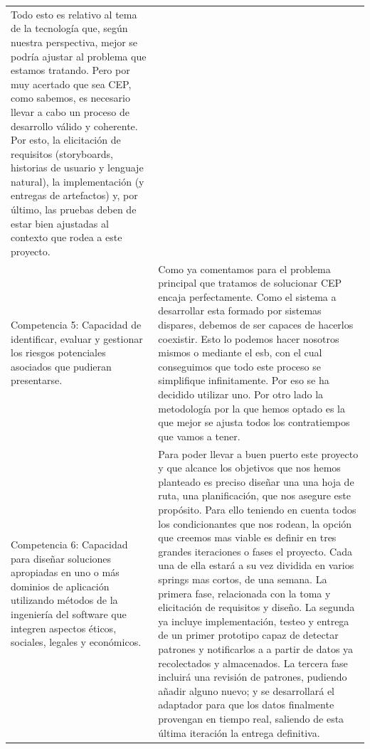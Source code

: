 \documentclass[a4paper]{article}
\begin{document}
\begin{longtable}{m{5.605cm}m{10.849cm}}
{    Todo esto es relativo al tema de la tecnología que, según nuestra perspectiva, mejor se podría ajustar al problema que estamos tratando. Pero por muy acertado que sea CEP, como sabemos, es necesario llevar a cabo un proceso de desarrollo válido y coherente. Por esto, la elicitación de requisitos (storyboards, historias de usuario y lenguaje natural), la implementación (y entregas de artefactos) y, por último, las pruebas deben de estar bien ajustadas al contexto que rodea a este proyecto.}\\
    
    {\color{black} Competencia 5: Capacidad de identificar, evaluar y gestionar los riesgos potenciales asociados que pudieran presentarse.} &
    {\color{black} Como ya comentamos para el problema principal que tratamos de solucionar CEP encaja perfectamente.
      Como el sistema a desarrollar esta formado por sistemas dispares, debemos de ser capaces de hacerlos coexistir. Esto lo podemos hacer nosotros mismos o mediante el esb, con el cual conseguimos que todo este proceso se simplifique infinitamente. Por eso se ha decidido utilizar uno.
      Por otro lado la metodología por la que hemos optado es la que mejor se ajusta todos los contratiempos que vamos a tener.
   	}\\
    
    \rowcolor{gray!30}
    {\color{black} Competencia 6: Capacidad para dise\~nar soluciones apropiadas en uno o m\'as dominios de aplicaci\'on utilizando m\'etodos de la ingenier\'ia del software que integren aspectos \'eticos, sociales, legales y econ\'omicos.} &
    {\color{black} Para poder llevar a buen puerto este proyecto y que alcance los objetivos que nos hemos planteado es preciso diseñar una una hoja de ruta, una planificación, que nos asegure este propósito. Para ello teniendo en cuenta todos los condicionantes que nos rodean, la opción que creemos mas viable es definir en tres grandes iteraciones o fases el proyecto. Cada una de ella estará a su vez dividida en varios springs mas cortos, de una semana. La primera fase, relacionada con la toma y elicitación de requisitos y diseño. La segunda ya incluye implementación, testeo y entrega de un primer prototipo capaz de detectar patrones y notificarlos a a partir de datos ya recolectados y almacenados. La tercera fase incluirá una revisión de patrones, pudiendo añadir alguno nuevo; y se desarrollará el adaptador para que los datos finalmente provengan en tiempo real, saliendo de esta última iteración la entrega definitiva.
    }\\
\end{longtable}
\bigskip
\end{document}
